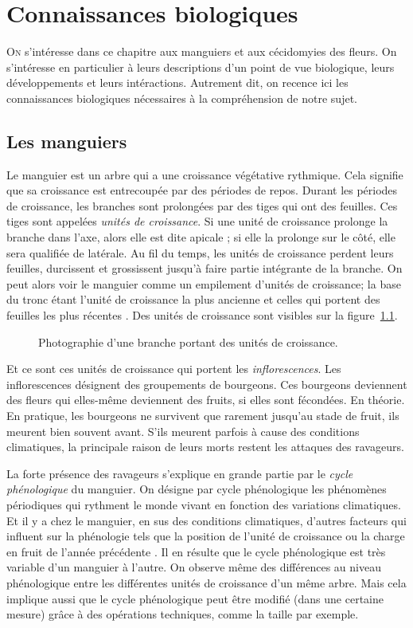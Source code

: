 \chapter{Connaissances biologiques} 

\lettrine{O}{n} s'intéresse dans ce chapitre aux manguiers et aux cécidomyies des fleurs.
On s'intéresse en particulier à leurs descriptions d'un point de vue biologique, leurs développements et leurs intéractions.
Autrement dit, on recence ici les connaissances biologiques nécessaires à la compréhension de notre sujet.


\section{Les manguiers}

Le manguier est un arbre qui a une croissance végétative rythmique.
Cela signifie que sa croissance est entrecoupée par des périodes de repos.
Durant les périodes de croissance, les branches sont prolongées par des tiges qui ont des feuilles.
Ces tiges sont appelées \emph{unités de croissance}. 
Si une unité de croissance prolonge la branche dans l'axe, alors elle est dite apicale ; si elle la prolonge sur le côté, elle sera qualifiée de latérale.
Au fil du temps, les unités de croissance perdent leurs feuilles, durcissent et grossissent jusqu'à faire partie intégrante de la branche.
On peut alors voir le manguier comme un empilement d'unités de croissance;
la base du tronc étant l'unité de croissance la plus ancienne et celles qui portent des feuilles les plus récentes \citep{normand2009}.
Des unités de croissance sont visibles sur la figure~\ref{fig:uc}.
\begin{figure}[ht]
 \centering
 \caption{Photographie d'une branche portant des unités de croissance.}
 \label{fig:uc}
\end{figure}

Et ce sont ces unités de croissance qui portent les \emph{inflorescences}.
Les inflorescences désignent des groupements de bourgeons. 
Ces bourgeons deviennent des fleurs qui elles-même deviennent des fruits, si elles sont fécondées.
En théorie.
En pratique, les bourgeons ne survivent que rarement jusqu'au stade de fruit, ils meurent bien souvent avant.
S'ils meurent parfois à cause des conditions climatiques, la principale raison de leurs morts restent les attaques des ravageurs.

La forte présence des ravageurs s'explique en grande partie par le \emph{cycle phénologique} du manguier.
On désigne par cycle phénologique les phénomènes périodiques qui rythment le monde vivant en fonction des variations climatiques.
Et il y a chez le manguier, en sus des conditions climatiques, d'autres facteurs qui influent sur la phénologie tels que la position de l'unité de croissance ou la charge en fruit de l'année précédente \citep{magne2004effet, normand2009axis}.
Il en résulte que le cycle phénologique est très variable d'un manguier à l'autre.
On observe même des différences au niveau phénologique entre les différentes unités de croissance d'un même arbre.
Mais cela implique aussi que le cycle phénologique peut être modifié (dans une certaine mesure) grâce à des opérations techniques, comme la taille par exemple.

